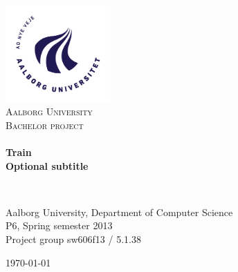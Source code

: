 \begin{titlingpage}
\begin{center}
\includegraphics[width=0.30\textwidth]{img/titelblad/AAU_logo_2012}~\\[0.5cm]

\textsc{\LARGE Aalborg University}\\[0.5cm]

\textsc{\Large Bachelor project}\\[0.5cm]

\HRule \\[0.4cm]
{ \huge \bfseries Train}\\[0.4cm]
{ \bfseries Optional subtitle}

\HRule \\[0.5cm]

\begin{minipage}{\textwidth}
\begin{center}
	Aalborg University, Department of Computer Science\\
	P6, Spring semester 2013\\
	Project group sw606f13 / 5.1.38\\
\end{center}
\end{minipage}

\begin{figure}[H]
\end{figure}

\vfill



{\large \today}

\end{center}
\end{titlingpage}
